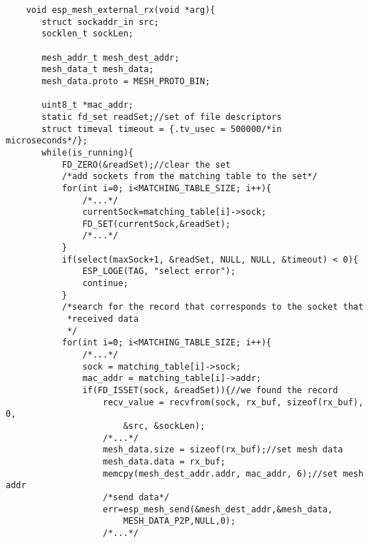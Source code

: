 \begin{verbatim}
    void esp_mesh_external_rx(void *arg){
       struct sockaddr_in src;
       socklen_t sockLen;
   
       mesh_addr_t mesh_dest_addr;
       mesh_data_t mesh_data;
       mesh_data.proto = MESH_PROTO_BIN;
   
       uint8_t *mac_addr;
       static fd_set readSet;//set of file descriptors
       struct timeval timeout = {.tv_usec = 500000/*in microseconds*/};
       while(is_running){
           FD_ZERO(&readSet);//clear the set
           /*add sockets from the matching table to the set*/
           for(int i=0; i<MATCHING_TABLE_SIZE; i++){
               /*...*/
               currentSock=matching_table[i]->sock;
               FD_SET(currentSock,&readSet);
               /*...*/
           }
           if(select(maxSock+1, &readSet, NULL, NULL, &timeout) < 0){
               ESP_LOGE(TAG, "select error");
               continue;
           }
           /*search for the record that corresponds to the socket that
            *received data
            */
           for(int i=0; i<MATCHING_TABLE_SIZE; i++){
               /*...*/
               sock = matching_table[i]->sock;
               mac_addr = matching_table[i]->addr;  
               if(FD_ISSET(sock, &readSet)){//we found the record
                   recv_value = recvfrom(sock, rx_buf, sizeof(rx_buf), 0,
                       &src, &sockLen);
                   /*...*/
                   mesh_data.size = sizeof(rx_buf);//set mesh data
                   mesh_data.data = rx_buf;
                   memcpy(mesh_dest_addr.addr, mac_addr, 6);//set mesh addr
                   /*send data*/
                   err=esp_mesh_send(&mesh_dest_addr,&mesh_data,
                       MESH_DATA_P2P,NULL,0);
                   /*...*/      
               
               \end{verbatim}